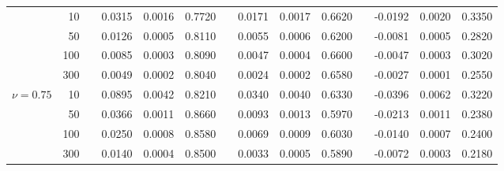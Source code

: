 \begin{table}[h]
\begin{center}
\begin{tabular}{rrcrrrcrrrcrrr}
  &    10 && 0.0315 & 0.0016 & 0.7720 && 0.0171 & 0.0017 & 0.6620 && -0.0192 & 0.0020 & 0.3350 \\ 
  &    50 && 0.0126 & 0.0005 & 0.8110 && 0.0055 & 0.0006 & 0.6200 && -0.0081 & 0.0005 & 0.2820 \\ 
  &   100 && 0.0085 & 0.0003 & 0.8090 && 0.0047 & 0.0004 & 0.6600 && -0.0047 & 0.0003 & 0.3020 \\ 
  &   300 && 0.0049 & 0.0002 & 0.8040 && 0.0024 & 0.0002 & 0.6580 && -0.0027 & 0.0001 & 0.2550 \\ \hline
   \multirow{4}{*}{$\nu=0.75$} 
  &    10 && 0.0895 & 0.0042 & 0.8210 && 0.0340 & 0.0040 & 0.6330 && -0.0396 & 0.0062 & 0.3220 \\ 
  &    50 && 0.0366 & 0.0011 & 0.8660 && 0.0093 & 0.0013 & 0.5970 && -0.0213 & 0.0011 & 0.2380 \\ 
  &   100 && 0.0250 & 0.0008 & 0.8580 && 0.0069 & 0.0009 & 0.6030 && -0.0140 & 0.0007 & 0.2400 \\ 
  &   300 && 0.0140 & 0.0004 & 0.8500 && 0.0033 & 0.0005 & 0.5890 && -0.0072 & 0.0003 & 0.2180 \\   \hline
\end{tabular}
\end{center}
\end{table}

